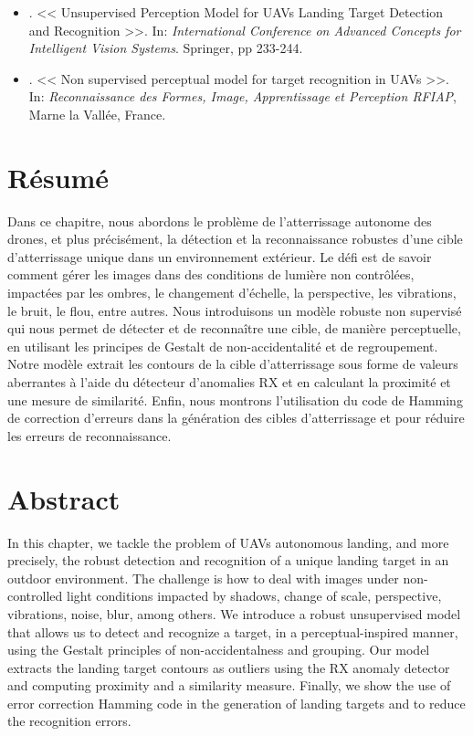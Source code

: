 \begin{itemize}
	\item \citep{Bazan.Dokladal.ea:ACIVS:2018}. << Unsupervised Perception Model for UAVs Landing Target Detection and Recognition >>. In: \textit{International Conference on Advanced Concepts for Intelligent Vision Systems}. Springer, pp 233-244.
	\item \citep{Bazan.Dokladal.ea:RFIAP:2018}. << Non supervised perceptual model for target recognition in UAVs >>. In: \textit{Reconnaissance des Formes, Image, Apprentissage et Perception RFIAP}, Marne la Vallée, France.
\end{itemize}

\section*{Résumé}
\noindent Dans ce chapitre, nous abordons le problème de l'atterrissage autonome des drones, et plus précisément, la détection et la reconnaissance robustes d'une cible d'atterrissage unique dans un environnement extérieur. Le défi est de savoir comment gérer les images dans des conditions de lumière non contrôlées, impactées par les ombres, le changement d'échelle, la perspective, les vibrations, le bruit, le flou, entre autres. Nous introduisons un modèle robuste non supervisé qui nous permet de détecter et de reconnaître une cible, de manière perceptuelle, en utilisant les principes de Gestalt de non-accidentalité et de regroupement. Notre modèle extrait les contours de la cible d'atterrissage sous forme de valeurs aberrantes à l'aide du détecteur d'anomalies RX et en calculant la proximité et une mesure de similarité. Enfin, nous montrons l'utilisation du code de Hamming de correction d'erreurs dans la génération des cibles d'atterrissage et pour réduire les erreurs de reconnaissance.

\section*{Abstract}
\noindent In this chapter, we tackle the problem of UAVs autonomous landing, and more precisely, the robust detection and recognition of a unique landing target in an outdoor environment. The challenge is how to deal with images under non-controlled light conditions impacted by shadows, change of scale, perspective, vibrations, noise, blur, among others. We introduce a robust unsupervised model that allows us to detect and recognize a target, in a perceptual-inspired manner, using the Gestalt principles of non-accidentalness and grouping.  Our model extracts the landing target contours as outliers using the RX anomaly detector and computing proximity and a similarity measure.  Finally, we show the use of error correction Hamming code in the generation of landing targets and to reduce the recognition errors. 


